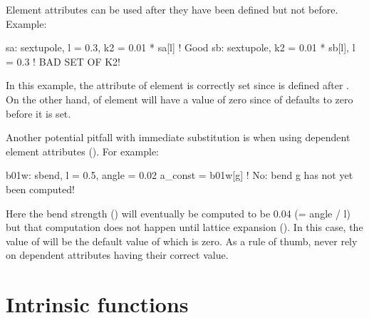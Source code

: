 {{Element attributes can be used after they have been defined but not
before.  Example:
\begin{example}
  sa: sextupole, l = 0.3, k2 = 0.01 * sa[l]  ! Good
  sb: sextupole, k2 = 0.01 * sb[l], l = 0.3  ! BAD SET OF K2!
\end{example}
In this example, the  attribute of element  is correctly
set since  is defined after . On the other hand, 
of element  will have a value of zero since  of 
defaults to zero before it is set.

Another potential pitfall with immediate substitution is when using
dependent element attributes (). For example:
\begin{example}
  b01w: sbend, l = 0.5, angle = 0.02
  a_const = b01w[g]    ! No: bend g has not yet been computed!
\end{example}
Here the bend strength  () will eventually be
computed to be 0.04 (= angle / l) but that computation does not happen
until lattice expansion (). In this case, the value of
 will be the default value of  which is zero.  As a
rule of thumb, never rely on dependent attributes having their correct
value.

\section{Intrinsic functions}
\label{s:functions}

}}
